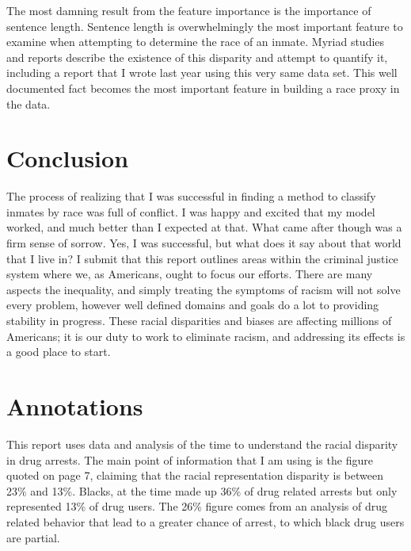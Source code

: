 \documentclass[11pt]{article}
\begin{document}
The most damning result from the feature importance is the importance of sentence length. Sentence length is overwhelmingly the most important feature to examine when attempting to determine the race of an inmate. Myriad studies\cite{disp} and reports\cite{sent} describe the existence of this disparity and attempt to quantify it, including a report that I wrote last year using this very same data set. This well documented fact becomes the most important feature in building a race proxy in the data.


\hypertarget{conclusion}{%
\section{Conclusion}\label{conclusion}}
The process of realizing that I was successful in finding a method to classify inmates by race was full of conflict. I was happy and excited that my model worked, and much better than I expected at that. What came after though was a firm sense of sorrow. Yes, I was successful, but what does it say about that world that I live in? I submit that this report outlines areas within the criminal justice system where we, as Americans, ought to focus our efforts. There are many aspects the inequality, and simply treating the symptoms of racism will not solve every problem, however well defined domains and goals do a lot to providing stability in progress. These racial disparities and biases are affecting millions of Americans; it is our duty to work to eliminate racism, and addressing its effects is a good place to start.

\pagebreak
\nocite{*}
\hypertarget{references}{%
\printbibliography\label{references}}

\hypertarget{annotations}{%
\section*{Annotations}\label{annotations}}

\cite{lgbm}This report uses data and analysis of the time to understand the racial disparity in drug arrests. The main point of information that I am using is the figure quoted on page 7, claiming that the racial representation disparity is between 23\% and 13\%. Blacks, at the time made up 36\% of drug related arrests but only represented 13\% of drug users. The 26\% figure comes from an analysis of drug related behavior that lead to a greater chance of arrest, to which black drug users are partial. 
\end{document}
